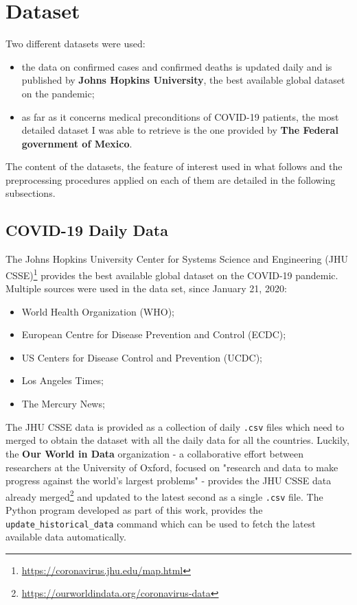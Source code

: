 \documentclass[11pt,a4paper]{article}
\begin{document}
\section{Dataset}
Two different datasets were used:
\begin{itemize}
    \item the data on confirmed cases and confirmed deaths is updated daily and
    is published by \textbf{Johns Hopkins University}, the best available global
    dataset on the pandemic;
    \item as far as it concerns medical preconditions of COVID-19 patients,
    the most detailed dataset I was able to retrieve is the one provided by
    \textbf{The Federal government of Mexico}.
\end{itemize}
The content of the datasets, the feature of interest used in what follows and
the preprocessing procedures applied on each of them are detailed in the
following subsections.
\subsection{COVID-19 Daily Data}
The Johns Hopkins University Center for Systems Science and Engineering
(JHU CSSE)\footnote{\url{https://coronavirus.jhu.edu/map.html}} provides the
best available global dataset on the COVID-19 pandemic. Multiple sources were
used in the data set, since January 21, 2020:
\begin{itemize}
    \item World Health Organization (WHO);
    \item European Centre for Disease Prevention and Control (ECDC);
    \item US Centers for Disease Control and Prevention (UCDC);
    \item Los Angeles Times;
    \item The Mercury News;
\end{itemize}
The JHU CSSE data is provided as a collection of daily \texttt{.csv} files which
need to merged to obtain the dataset with all the daily data for all the
countries. Luckily, the \textbf{Our World in Data} organization - a
collaborative effort between researchers at the University of Oxford, focused on
"research and data to make progress against the world's largest problems" -
provides the JHU CSSE data already
merged\footnote{\url{https://ourworldindata.org/coronavirus-data}} and updated
to the latest second as a single \texttt{.csv} file. The Python program
developed as part of this work, provides the \texttt{update\_historical\_data}
command which can be used to fetch the latest available data automatically.
\end{document}
